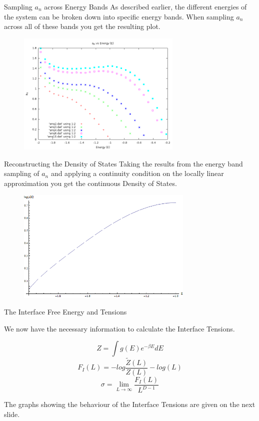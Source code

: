 \documentclass[12pt]{beamer}
\begin{document}
\begin{frame}{Sampling $a_n$ across Energy Bands}
As described earlier, the different energies of the system can be broken down into specific energy bands.
When sampling $a_n$ across all of these bands you get the resulting plot.
\begin{figure}
\centering
\includegraphics[width=0.7\textwidth]{a_n-rescaled.png}
\end{figure}
\end{frame}

\begin{frame}{Reconstructing the Density of States}
Taking the results from the energy band sampling of $a_n$ and applying a continuity condition on the locally linear approximation you get the continuous Density of States.
\begin{figure}
\centering
\includegraphics[width=0.75\textwidth]{Q2Log(g(E)).png}
\end{figure}
\end{frame}

\begin{frame}{The Interface Free Energy and Tensions}

We now have the necessary information to calculate the Interface Tensions.

\begin{equation}
Z = \int g(E) e^{-\beta E} dE
\end{equation}
\begin{equation}
F_I (L) = -log \frac{\tilde{Z}(L)}{Z(L)} - log(L)
\end{equation}
\begin{equation}
\sigma = \lim_{L \to \infty} \frac{F_I(L)}{L^{D-1}}
\end{equation}

The graphs showing the behaviour of the Interface Tensions are given on the next slide.

\end{frame}
\end{document}
